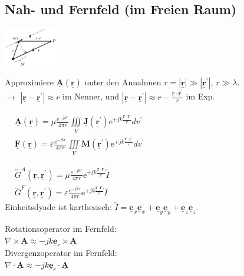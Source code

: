 \documentclass[english]{latex4ei/latex4ei_sheet}
\renewcommand{\vec}[1]{\underline{\boldsymbol{#1}}}
\begin{document}
\begin{sectionbox}
	\subsection{Nah- und Fernfeld (im Freien Raum)}
	
	\begin{center}\includegraphics[width = 2.3cm]{./img/fernfeld.png}\end{center}

	Approximiere $\vec{A}(\vec{r})$ unter den Annahmen $r = |\vec{r}|\gg |\vec{r}^{\prime}|$, $r \gg \lambda$.\\
	$\rightarrow$ $|\vec{r} - \vec{r}^{\prime}| \approx r$ im Nenner, und $|\vec{r} - \vec{r}^{\prime}| \approx r - \frac{\vec{r}\cdot\vec{r}^{\prime}}{r}$ im Exp.\\

	\begin{emphbox}
		$\begin{aligned}
			&\vec{A}(\vec{r})=\mu \frac{\mathrm{e}^{-j k r}}{4 \pi r} \iiint\limits_{V} \vec{J}\left(\vec{r}^{\prime}\right) \mathrm{e}^{+j k \frac{\vec{r}\cdot \vec{r}^{\prime}}{r} } d v^{\prime} \\
			&\vec{F}(\vec{r})=\varepsilon \frac{\mathrm{e}^{-j k r}}{4 \pi r} \iiint\limits_{V} \vec{M}\left(\vec{r}^{\prime}\right) \mathrm{e}^{+j k \frac{\vec{r}\cdot \vec{r}^{\prime} }{r}} d v^{\prime}
			\end{aligned}$
	\end{emphbox}
	\begin{emphbox}
		$\begin{aligned}
			&\overleftrightarrow{G}^A(\vec{r}, \vec{r}^\prime)=\mu \frac{\mathrm{e}^{-j k r}}{4 \pi r} \mathrm{e}^{+j k \frac{\vec{r}\cdot \vec{r}^{\prime}}{r} } \overleftrightarrow{I} \\
			&\overleftrightarrow{G}^F(\vec{r}, \vec{r}^\prime)=\varepsilon \frac{\mathrm{e}^{-j k r}}{4 \pi r} \mathrm{e}^{+j k \frac{\vec{r}\cdot \vec{r}^{\prime}}{r} } \overleftrightarrow{I}
			\end{aligned}$\\
			\vspace{1em}
			Einheitsdyade ist karthesisch: $\overleftrightarrow{I} = \vec{e}_x\vec{e}_x + \vec{e}_y\vec{e}_y + \vec{e}_z\vec{e}_z$.
	\end{emphbox}
	\begin{emphbox}
		Rotationsoperator im Fernfeld:\\
		$\nabla \times \vec{A} \approx -jk \vec{e}_r \times \vec{A}$\\
		Divergenzoperator im Fernfeld:\\
		$\nabla \cdot \vec{A} \approx -jk \vec{e}_r \cdot \vec{A}$\\
	\end{emphbox}
\end{sectionbox}
\end{document}
